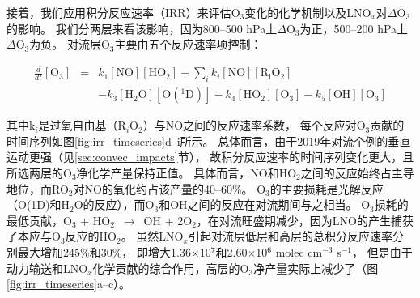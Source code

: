 接着，我们应用积分反应速率（IRR）来评估O$_3$变化的化学机制以及LNO$_x$对$\Delta$O$_3$的影响。
我们分两层来看该影响，因为800--500 hPa上$\Delta$O$_3$为正，500--200 hPa上$\Delta$O$_3$为负。
对流层O$_3$主要由五个反应速率项控制\citep{Pickering.1990}：

\begin{eqnarray}
  \frac{d}{dt}[\mathrm{O_3}] & = & k_1[\mathrm{NO}][\mathrm{HO_2}] + \sum_{i}  k_i[\mathrm{NO}][\mathrm{R_iO_2}] \nonumber \\
                             && - k_3[\mathrm{H_2O}][\mathrm{O(^1D)}] - k_4[\mathrm{HO_2}][\mathrm{O_3}] - k_5[\mathrm{OH}][\mathrm{O_3}]
\end{eqnarray}

其中k$_i$是过氧自由基（R$_i$O$_2$）与NO之间的反应速率系数，
每个反应对O$_3$贡献的时间序列如图\ref{fig:irr_timeseries}d--i所示。
总体而言，由于2019年对流个例的垂直运动更强（见\ref{sec:convec_impacts}节），
故积分反应速率的时间序列变化更大，且所选两层的O$_3$净化学产量保持正值。
具体而言，NO和HO$_2$之间的反应始终占主导地位，而RO$_2$对NO的氧化约占该产量的40--60\%。
O$_3$的主要损耗是光解反应（O(1D)和H$_2$O的反应），而O$_3$和OH之间的反应在对流期间与之相当。
O$_3$损耗的最低贡献，O$_3$ + HO$_2$ $\,\to\,$ OH + 2O$_2$，在对流旺盛期减少，因为LNO的产生捕获了本应与O$_3$反应的HO$_2$。
虽然LNO$_x$引起对流层低层和高层的总积分反应速率分别最大增加245\%和30\%，
即增大1.36$\times$10$^7$和2.60$\times$10$^6$ molec cm$^{-3}$ s$^{-1}$，
但是由于动力输送和LNO$_x$化学贡献的综合作用，高层的O$_3$净产量实际上减少了（图\ref{fig:irr_timeseries}a--c）。


